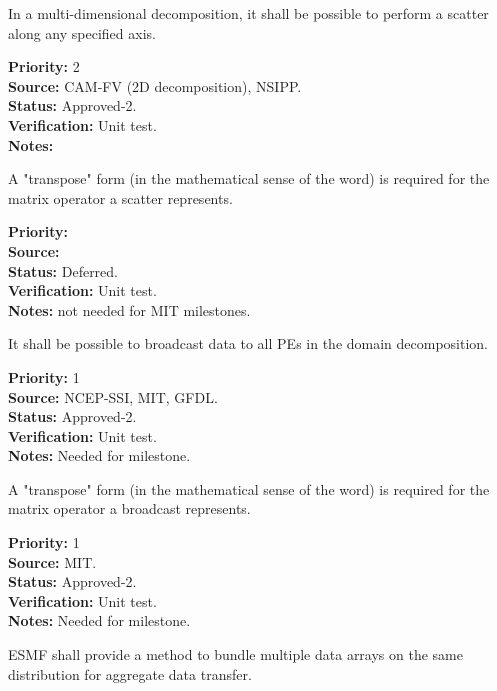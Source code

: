 
In a multi-dimensional decomposition, it shall be possible to perform
a scatter along any specified axis.

\begin{reqlist}
{\bf Priority:} 2 \\ 
{\bf Source:} CAM-FV (2D decomposition), NSIPP. \\
{\bf Status:} Approved-2. \\
{\bf Verification:} Unit test. \\
{\bf Notes:} 
\end{reqlist}

A "transpose" form (in the mathematical sense of the word) is required
for the matrix operator a scatter represents.
\begin{reqlist}
{\bf Priority:} \\ 
{\bf Source:} \\
{\bf Status:} Deferred. \\
{\bf Verification:} Unit test. \\
{\bf Notes:} not needed for MIT milestones.
\end{reqlist}


It shall be possible to broadcast data to all PEs in the domain decomposition.

\begin{reqlist}
{\bf Priority:} 1 \\ 
{\bf Source:} NCEP-SSI, MIT, GFDL. \\
{\bf Status:} Approved-2. \\
{\bf Verification:} Unit test. \\
{\bf Notes:} Needed for milestone.
\end{reqlist}

A "transpose" form (in the mathematical sense of the word) is required
for the matrix operator a broadcast represents.
\begin{reqlist}
{\bf Priority:} 1 \\ 
{\bf Source:}  MIT. \\
{\bf Status:} Approved-2. \\
{\bf Verification:} Unit test. \\
{\bf Notes:} Needed for milestone.
\end{reqlist}


ESMF shall provide a method to bundle multiple data arrays on the same
distribution for aggregate data transfer.

